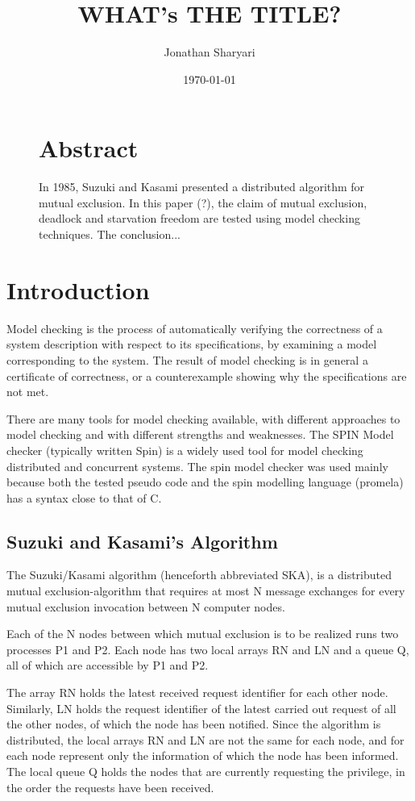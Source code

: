 \documentclass[a4paper,12pt]{article}
\title{\textbf{WHAT's THE TITLE?}}
\author{Jonathan Sharyari}  %
\date{\today}
\begin{document}
\maketitle

\begin{figure}
\section*{\large Abstract}
In 1985, Suzuki and Kasami presented a distributed algorithm for mutual exclusion. In this paper (?), the claim of mutual exclusion, deadlock and starvation freedom are tested using model checking techniques. The conclusion...
\end{figure}
\newpage

\section{Introduction}
Model checking is the process of automatically verifying the correctness of a system description with respect to its specifications, by examining a model corresponding to the system. The result of model checking is in general a certificate of correctness, or a counterexample showing why the specifications are not met.

There are many tools for model checking available, with different approaches to model checking and with different strengths and weaknesses. The SPIN Model checker (typically written Spin) is a widely used tool for model checking distributed and concurrent systems. The spin model checker was used mainly because both the tested pseudo code and the spin modelling language (promela) has a syntax close to that of C.


\subsection{Suzuki and Kasami's Algorithm}

The Suzuki/Kasami algorithm (henceforth abbreviated SKA), is a distributed mutual exclusion-algorithm that requires at most N message exchanges for every mutual exclusion invocation between N computer nodes.

Each of the N nodes between which mutual exclusion is to be realized runs two processes P1 and P2. Each node has two local arrays RN and LN and a queue Q, all of which are accessible by P1 and P2.

The array RN holds the latest received request identifier for each other node. Similarly, LN holds the request identifier of the latest carried out request of all the other nodes, of which the node has been notified. Since the algorithm is distributed, the local arrays RN and LN are not the same for each node, and for each node represent only the information of which the node has been informed.
The local queue Q holds the nodes that are currently requesting the privilege, in the order the requests have been received.
\end{document}

